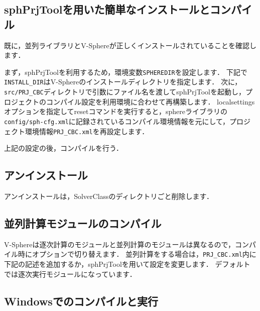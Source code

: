 %
\subsection{sphPrjToolを用いた簡単なインストールとコンパイル}
既に，並列ライブラリとV-Sphereが正しくインストールされていることを確認します．

まず，sphPrjToolを利用するため，環境変数\verb|SPHEREDIR|を設定します．
下記で\verb|INSTALL_DIR|はV-Sphereのインストールディレクトリを指定します．
次に，\verb|src/PRJ_CBC|ディレクトリで引数にファイル名を渡してsphPrjToolを起動し，プロジェクトのコンパイル設定を利用環境に合わせて再構築します．
localsettingsオプションを指定してresetコマンドを実行すると，sphereライブラリの\verb|config/sph-cfg.xml|に記録されているコンパイル環境情報を元にして，プロジェクト環境情報\verb|PRJ_CBC.xml|を再設定します．

{\small
{}
}

上記の設定の後，コンパイルを行う．

{\small
{}
}

%
\subsection{アンインストール}
アンインストールは，SolverClassのディレクトリごと削除します．

%
\subsection{並列計算モジュールのコンパイル}
V-Sphereは逐次計算のモジュールと並列計算のモジュールは異なるので，コンパイル時にオプションで切り替えます．
並列計算をする場合は，\verb|PRJ_CBC.xml|内に下記の記述を追加するか，sphPrjToolを用いて設定を変更します．
デフォルトでは逐次実行モジュールになっています．

{\small
{}
}

%
\hypertarget{tgt:win_compile}{\subsection{Windowsでのコンパイルと実行}}

